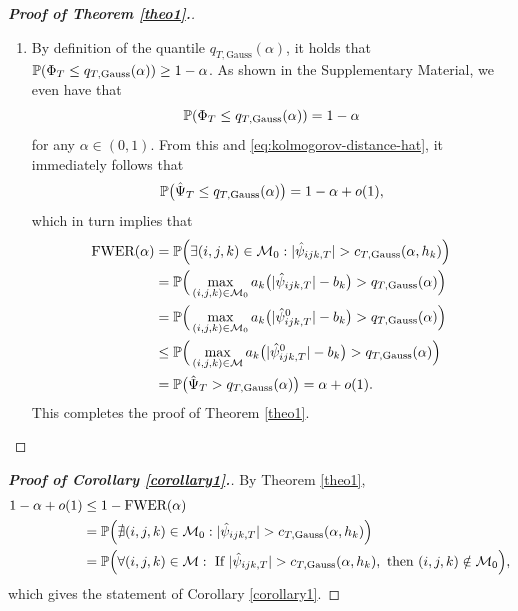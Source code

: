 \documentclass[a4paper,12pt]{article}
\numberwithin{equation}{section}
\begin{document}
\begin{proof}[\textnormal{\textbf{Proof of Theorem \ref{theo1}.}}]
\begin{enumerate}[label=\textit{Step \arabic*.}, leftmargin=0cm, itemindent=1.45cm]
\item By definition of the quantile $q_{T,\text{Gauss}}(\alpha)$, it holds that $\mathbb{P}(\Phi_T \le q_{T,\text{Gauss}}(\alpha)) \ge 1-\alpha$. As shown in the Supplementary Material, we even have that  
\begin{equation}\label{eq:quant-exact}
\mathbb{P}(\Phi_T \le q_{T,\text{Gauss}}(\alpha)) = 1-\alpha
\end {equation} 
for any $\alpha \in (0,1)$. From this and \eqref{eq:kolmogorov-distance-hat}, it immediately follows that  
\begin{equation}\label{eq:probbound-Psihat}
\mathbb{P} \big( \hat{\Psi}_T \le q_{T,\text{Gauss}}(\alpha) \big) = 1 - \alpha + o(1), 
\end{equation}
which in turn implies that 
\begin{align*}
\text{FWER}(\alpha)
 & = \mathbb{P} \Big( \exists (i,j,k) \in \mathcal{M}_0: |\hat{\psi}_{ijk,T}| > c_{T,\text{Gauss}}(\alpha,h_k) \Big) \\
 & = \mathbb{P} \Big( \max_{(i,j,k) \in \mathcal{M}_0} a_k \big( |\hat{\psi}_{ijk,T}| - b_k \big) > q_{T,\text{Gauss}}(\alpha) \Big) \\
 & = \mathbb{P} \Big( \max_{(i,j,k) \in \mathcal{M}_0} a_k \big( |\hat{\psi}_{ijk,T}^0| - b_k \big) > q_{T,\text{Gauss}}(\alpha) \Big) \\
 & \le \mathbb{P} \Big( \max_{(i,j,k) \in \mathcal{M}} a_k \big( |\hat{\psi}_{ijk,T}^0| - b_k \big) > q_{T,\text{Gauss}}(\alpha) \Big) \\
 & = \mathbb{P} \big( \hat{\Psi}_T > q_{T,\text{Gauss}}(\alpha) \big) = \alpha + o(1).
\end{align*}
This completes the proof of Theorem \ref{theo1}. \qedhere


\end{enumerate}
\end{proof}


\begin{proof}[\textnormal{\textbf{Proof of Corollary \ref{corollary1}.}}]
By Theorem \ref{theo1}, 
\begin{align*}
1 - \alpha + o(1) 
 & \le 1 - \textnormal{FWER}(\alpha) \\
 & = \mathbb{P} \Big( \nexists (i,j,k) \in \mathcal{M}_0: |\hat{\psi}_{ijk,T}| > c_{T,\textnormal{Gauss}}(\alpha,h_k) \Big) \\
 & = \mathbb{P}\Big( \forall (i,j,k) \in \mathcal{M}: \text{ If } |\hat{\psi}_{ijk,T}| > c_{T,\textnormal{Gauss}}(\alpha,h_k), \text{ then } (i,j,k) \notin \mathcal{M}_0 \Big),
\end{align*}
which gives the statement of Corollary \ref{corollary1}.
\end{proof}
\end{document}
